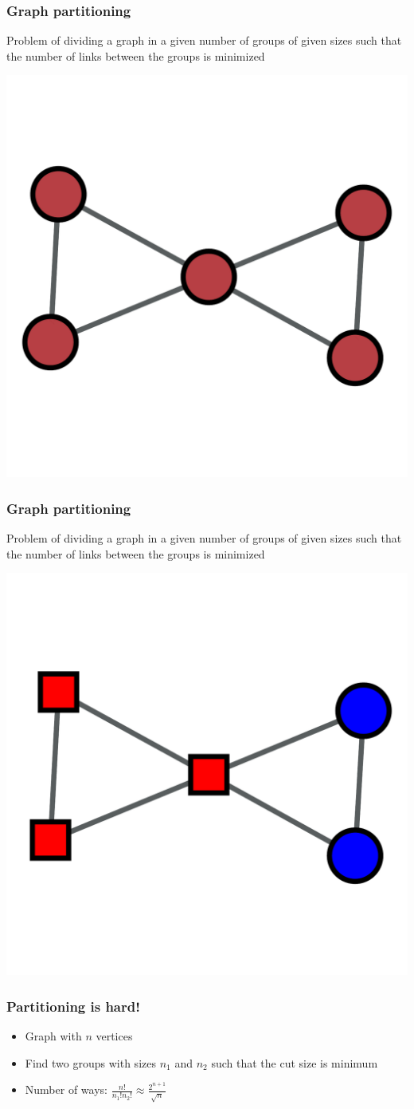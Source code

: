 \documentclass{beamer}
\begin{document}
\begin{frame}
    \frametitle{Graph partitioning}
    \centering
    Problem of dividing a graph in a given number of groups of given sizes such that the number of links between the groups is minimized

    \includegraphics[width=0.5\columnwidth]{small_graph1.pdf}
\end{frame}
\begin{frame}
    \frametitle{Graph partitioning}
    \centering
    Problem of dividing a graph in a given number of groups of given sizes such that the number of links between the groups is minimized

    \includegraphics[width=0.5\columnwidth]{small_graph2.pdf}
\end{frame}
\begin{frame}
    \frametitle{Partitioning is hard!}
   \centering 
    \begin{itemize}
    \setlength\itemsep{1em}
        \item{Graph with $n$ vertices}
        \item{Find two groups with sizes $n_1$ and $n_2$ such that the cut size is minimum}
        \item{Number of ways: $\frac{n!}{n_1!n_2!}\approx \frac{2^{n+1}}{\sqrt{n}}$}
    \end{itemize}
    \centering
\end{frame}
\end{document}
